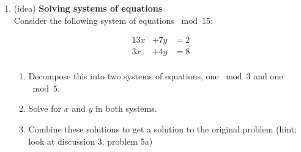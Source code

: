 \documentclass[]{article}
\newif\ifsolutions
\renewcommand{\answer}[1]{{\color{mydarkblue}\textbf{}#1}}
\begin{document}
\begin{qunlist}
\begin{enumerate}
{{}}\fi


\ifsolutions{ \answer {
\textbf{Motivation}
}}\fi
    
\end{enumerate}


\begin{enumerate}
\qpart
\item (idea) \textbf{Solving systems of equations}
  \\Consider the following system of equations $\bmod{15}$:
  
  \begin{align*}
    13x &+ 7y &= 2 \\
    3x &+ 4y &= 8 \\
  \end{align*}
  
  \begin{enumerate}
  \item Decompose this into two systems of equations, one $\bmod 3$ and one $\bmod 5$.
  \item Solve for $x$ and $y$ in both systems.
  \item Combine these solutions to get a solution to the original problem (hint: look at discussion 3, problem 5a)\\
    
  \end{enumerate}

\end{enumerate}

\ifsolutions{ \answer 
{

}}
\end{qunlist}
\end{document}
